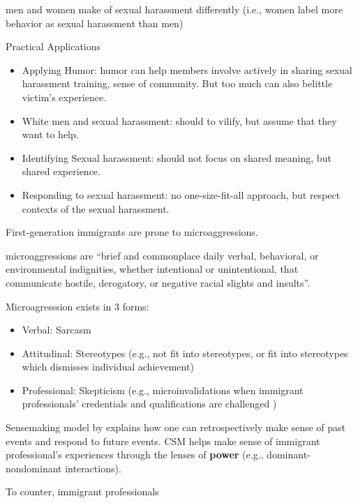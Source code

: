 \documentclass[
]{book}
\providecommand{\tightlist}{%
  \setlength{\itemsep}{0pt}\setlength{\parskip}{0pt}}
\begin{document}
men and women make of sexual harassment differently (i.e., women label more behavior as sexual harassment than men)

Practical Applications

\begin{itemize}
\tightlist
\item
  Applying Humor: humor can help members involve actively in sharing sexual harassment training, sense of community. But too much can also belittle victim's experience.
\item
  White men and sexual harassment: should to vilify, but assume that they want to help.
\item
  Identifying Sexual harassment: should not focus on shared meaning, but shared experience.
\item
  Responding to sexual harassment: no one-size-fit-all approach, but respect contexts of the sexual harassment.
\end{itemize}

\citep{Shenoy_Packer_2014}

First-generation immigrants are prone to microaggressions.

microaggressions are ``brief and commonplace daily verbal, behavioral, or environmental indignities, whether intentional or unintentional, that communicate hostile, derogatory, or negative racial slights and insults''.
\citep{Sue_2007}

Microagresssion exists in 3 forms:

\begin{itemize}
\tightlist
\item
  Verbal: Sarcasm
\item
  Attitudinal: Stereotypes (e.g., not fit into stereotypes, or fit into stereotypes which dismisses individual achievement)\\
\item
  Professional: Skepticism (e.g., microinvalidations when immigrant professionals' credentials and qualifications are challenged )
\end{itemize}

Sensemaking model by \citep{Weick_1995} explains how one can retrospectively make sense of past events and respond to future events.
CSM helps make sense of immigrant professional's experiences through the lenses of \textbf{power} (e.g., dominant-nondominant interactions).

To counter, immigrant professionals
\end{document}
